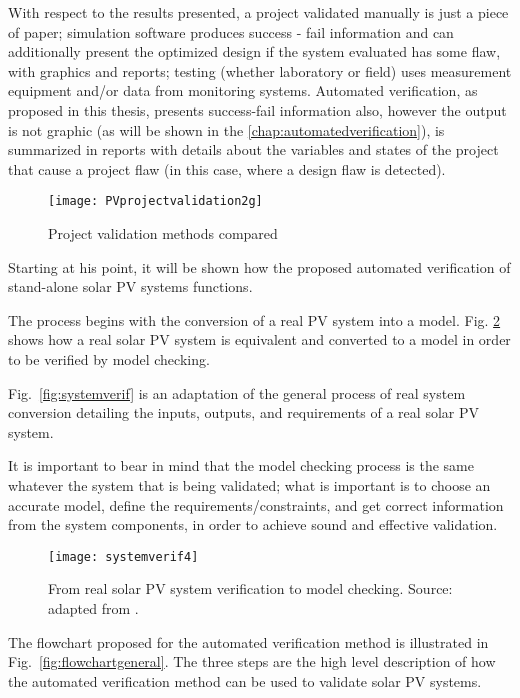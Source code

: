 With respect to the results presented, a project validated manually is just a piece of paper; simulation software produces success - fail information and can additionally present the optimized design if the system evaluated has some flaw, with graphics and reports; testing (whether laboratory or field) uses  measurement equipment and/or data from monitoring systems. Automated verification, as proposed in this thesis, presents success-fail information also, however the output is not graphic  (as will be shown in the  \autoref{chap:automatedverification}), is summarized in reports with details about the variables and states of the project that cause a project flaw (in this case,  where a design flaw is detected).

\begin{figure}[h]
\texttt{[image: PVprojectvalidation2g]}
\centering
\caption{Project validation methods compared}
\label{fig:validation}
\end{figure}

Starting at his point, it will be shown how the proposed automated verification of stand-alone solar PV systems functions. 

The process begins with the conversion of a real PV system into a model. Fig. \ref{fig:systemverif4} shows how a real solar PV system is equivalent and converted to a model in order to be verified by model checking. 

Fig.~\ref{fig:systemverif} is an adaptation of the general process of real system conversion detailing the inputs, outputs, and requirements of a real solar PV system. 

It is important to bear in mind that the model checking process is the same whatever the system that is being validated; what is  important is to choose an accurate model, define the requirements/constraints, and get correct information from the system components, in order to achieve sound and effective validation.

\begin{figure}[h]
\texttt{[image: systemverif4]}
\centering
\caption{From real solar PV system verification to model checking. Source: adapted from \cite{Clarke2008}.}
\label{fig:systemverif4}
\end{figure}

The flowchart proposed for the automated verification method is illustrated in Fig.~\ref{fig:flowchartgeneral}. The three steps are the high level description of how the automated verification method can be used to validate solar PV systems.

